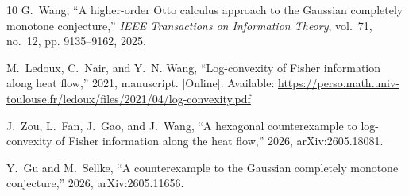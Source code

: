 \documentclass[10pt,letterpaper,journal]{IEEEtran}
\theoremstyle{plain}
\theoremstyle{definition}
\begin{document}
\begin{thebibliography}{10}
G.~Wang, ``A higher-order {Otto} calculus approach to the {Gaussian} completely
  monotone conjecture,'' \emph{IEEE Transactions on Information Theory},
  vol.~71, no.~12, pp. 9135--9162, 2025.

\BIBentryALTinterwordspacing
M.~Ledoux, C.~Nair, and Y.~N. Wang, ``Log-convexity of {Fisher} information
  along heat flow,'' 2021, manuscript. [Online]. Available:
  \url{https://perso.math.univ-toulouse.fr/ledoux/files/2021/04/log-convexity.pdf}
\BIBentrySTDinterwordspacing

J.~Zou, L.~Fan, J.~Gao, and J.~Wang, ``A hexagonal counterexample to
  log-convexity of {Fisher} information along the heat flow,'' 2026,
  arXiv:2605.18081.

Y.~Gu and M.~Sellke, ``A counterexample to the {Gaussian} completely monotone
  conjecture,'' 2026, arXiv:2605.11656.

\end{thebibliography}
 
\end{document}
